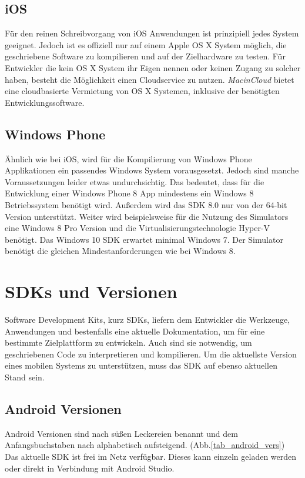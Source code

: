 \subsection{iOS}
Für den reinen Schreibvorgang von iOS Anwendungen ist prinzipiell jedes System geeignet. Jedoch ist es offiziell nur auf einem Apple OS X System möglich, die geschriebene Software zu kompilieren und auf der Zielhardware zu testen. Für Entwickler die kein OS X System ihr Eigen nennen oder keinen Zugang zu solcher haben, besteht die Möglichkeit einen Cloudservice zu nutzen. \textit{MacinCloud} bietet eine cloudbasierte Vermietung von OS X Systemen, inklusive der benötigten Entwicklungssoftware. \citep{macincloud}

\subsection{Windows Phone}
Ähnlich wie bei iOS, wird für die Kompilierung von Windows Phone Applikationen ein passendes Windows System vorausgesetzt. Jedoch sind manche Voraussetzungen leider etwas undurchsichtig. Das bedeutet, dass für die Entwicklung einer Windows Phone 8 App mindestens ein Windows 8 Betriebssystem benötigt wird. Außerdem wird das SDK 8.0 nur von der 64-bit Version unterstützt. Weiter wird beispielsweise für die Nutzung des Simulators eine Windows 8 Pro Version und die Virtualisierungstechnologie Hyper-V benötigt. Das Windows 10 SDK erwartet minimal Windows 7. Der Simulator benötigt die gleichen Mindestanforderungen wie bei Windows 8. \citep{WP8_requirements, WP10_SDK, WP10_Emulator} 

\section{SDKs und Versionen}
Software Development Kits, kurz SDKs, liefern dem Entwickler die Werkzeuge, Anwendungen und bestenfalls eine aktuelle Dokumentation, um für eine bestimmte Zielplattform zu entwickeln. Auch sind sie notwendig, um geschriebenen Code zu interpretieren und kompilieren. Um die aktuellste Version eines mobilen Systems zu unterstützen, muss das SDK auf ebenso aktuellen Stand sein.
\clearpage 

\subsection{Android Versionen}
Android Versionen sind nach süßen Leckereien benannt und dem Anfangsbuchstaben nach alphabetisch aufsteigend. (Abb.\ref{tab_android_vers})
Das aktuelle SDK ist frei im Netz verfügbar. Dieses kann einzeln geladen werden oder direkt in Verbindung mit Android Studio.

